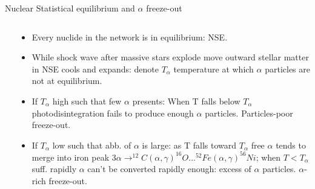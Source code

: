 \begin{frame}{Nuclear Statistical equilibrium and $\alpha$ freeze-out}
    \begin{columns}[T]
        \begin{column}{0.4\textwidth}
            
        \end{column}
        \begin{column}{0.6\textwidth}
            \begin{itemize}
                \item Every nuclide in the network is in equilibrium: NSE.
                \item While shock wave after massive stars explode move outward stellar matter in NSE cools and expands: denote $T_{\alpha}$ temperature at which $\alpha$ particles are not at equilibrium.
                \item If $T_{\alpha}$ high such that few $\alpha$ presents:  When T falls below $T_{\alpha}$ photodisintegration fails to produce enough $\alpha$ particles. Particles-poor freeze-out.
                \item If $T_{\alpha}$ low such that abb. of $\alpha$ is large: as T falls toward $T_{\alpha}$ free $\alpha$ tends to merge into iron peak $3\alpha\to^{12}C(\alpha,\gamma)^{16}O\ldots^{52}Fe(\alpha,\gamma)^{56}Ni$; when $T<T_{\alpha}$ suff. rapidly $\alpha$ can't be converted rapidly enough: excess of $\alpha$ particles. $\alpha$-rich freeze-out.
            \end{itemize}
        \end{column}
    \end{columns}
    
\end{frame}
